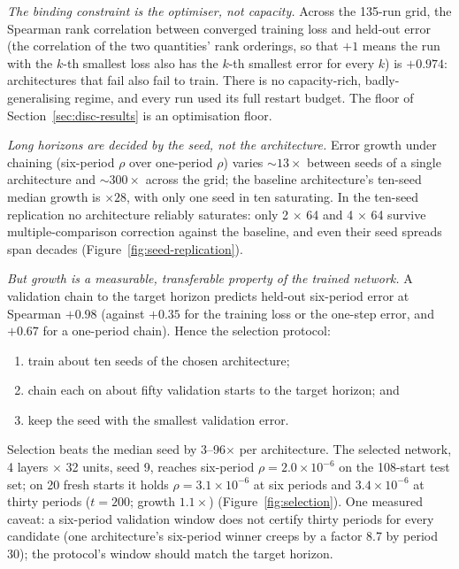 \documentclass[11pt,a4paper]{article}
\begin{document}
\emph{The binding constraint is the optimiser, not capacity.} Across the
135-run grid, the Spearman rank correlation between converged training
loss and held-out error (the correlation of the two quantities' rank
orderings, so that $+1$ means the run with the $k$-th smallest loss also
has the $k$-th smallest error for every $k$) is $+0.974$: architectures
that fail also fail to train. There is no capacity-rich,
badly-generalising regime, and every run used its full restart budget. The
floor of Section~\ref{sec:disc-results} is an optimisation floor.

\emph{Long horizons are decided by the seed, not the architecture.} Error
growth under chaining (six-period $\rho$ over one-period $\rho$) varies
${\sim}13\times$ between seeds of a single architecture and
${\sim}300\times$ across the grid; the baseline architecture's ten-seed
median growth is $\times 28$, with only one seed in ten saturating. In the
ten-seed replication no architecture reliably saturates: only
2 $\times$ 64 and 4 $\times$ 64 survive multiple-comparison correction
against the baseline, and even their seed spreads span decades
(Figure~\ref{fig:seed-replication}).

\emph{But growth is a measurable, transferable property of the trained
network.} A validation chain to the target horizon predicts held-out
six-period error at Spearman $+0.98$ (against $+0.35$ for the training
loss or the one-step error, and $+0.67$ for a one-period chain). Hence the
selection protocol:
\begin{enumerate}
  \item train about ten seeds of the chosen architecture;
  \item chain each on about fifty validation starts to the target
  horizon; and
  \item keep the seed with the smallest validation error.
\end{enumerate}
Selection beats the median seed by 3--96$\times$ per architecture. The
selected network, 4 layers $\times$ 32 units, seed 9, reaches six-period
$\rho = 2.0\times10^{-6}$ on the 108-start test set; on 20 fresh starts it
holds $\rho = 3.1\times10^{-6}$ at six periods and $3.4\times10^{-6}$ at
thirty periods ($t = 200$; growth $1.1\times$)
(Figure~\ref{fig:selection}). One measured caveat: a six-period validation
window does not certify thirty periods for every candidate (one
architecture's six-period winner creeps by a factor 8.7 by period 30); the
protocol's window should match the target horizon.
\end{document}
